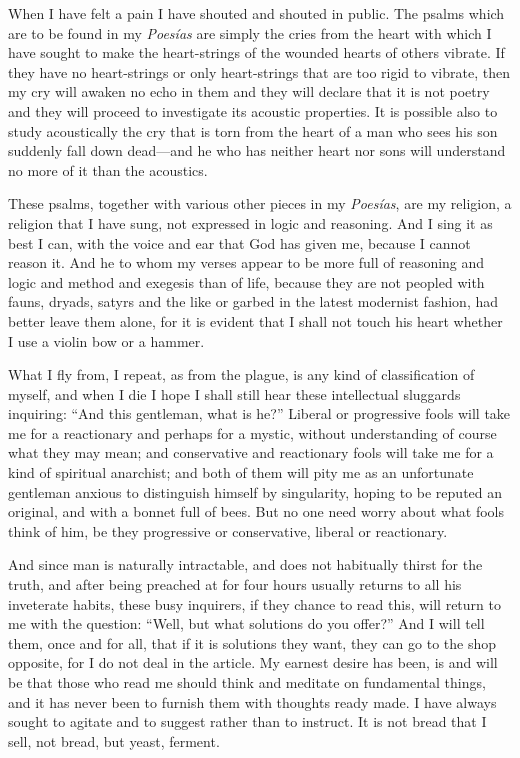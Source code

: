 When I have felt a pain I have shouted and shouted in public. The
psalms which are to be found in my \textit{Poes\'ias} are simply the
cries from the heart with which I have sought to make the
heart-strings of the wounded hearts of others vibrate. If they have no
heart-strings or only heart-strings that are too rigid to vibrate,
then my cry will awaken no echo in them and they will declare that it
is not poetry and they will proceed to investigate its acoustic
properties. It is possible also to study acoustically the cry that is
torn from the heart of a man who sees his son suddenly fall down
dead---and he who has neither heart nor sons will understand no more
of it than the acoustics.

These psalms, together with various other pieces in my
\textit{Poes\'ias}, are my religion, a religion that I have sung, not
expressed in logic and reasoning. And I sing it as best I can, with
the voice and ear that God has given me, because I cannot reason it.
And he to whom my verses appear to be more full of reasoning and logic
and method and exegesis than of life, because they are not peopled
with fauns, dryads, satyrs and the like or garbed in the latest
modernist fashion, had better  leave them alone, for it is
evident that I shall not touch his heart whether I use a violin bow or
a hammer.

What I fly from, I repeat, as from the plague, is any kind of
classification of myself, and when I die I hope I shall still hear
these intellectual sluggards inquiring: ``And this gentleman, what is
he?'' Liberal or progressive fools will take me for a reactionary and
perhaps for a mystic, without understanding of course what they may
mean; and conservative and reactionary fools will take me for a kind
of spiritual anarchist; and both of them will pity me as an
unfortunate gentleman anxious to distinguish himself by singularity,
hoping to be reputed an original, and with a bonnet full of bees. But
no one need worry about what fools think of him, be they progressive
or conservative, liberal or reactionary.

And since man is naturally intractable, and does not habitually thirst
for the truth, and after being preached at for four hours usually
returns to all his inveterate habits, these busy inquirers, if they
chance to read this, will return to me with the question: ``Well, but
what solutions do you offer?'' And I will tell them, once and for all,
that if it is solutions they want, they can go to the shop opposite,
for I do not deal in the article. My earnest desire has been, is and
will be that those who read me should think and meditate on
fundamental things, and it has never been to furnish them with
thoughts ready made. I have always sought to agitate and to suggest
rather than to instruct. It is not bread that I sell, not bread, but
yeast, ferment.

